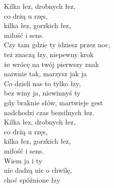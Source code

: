\begin{text}
    Kilka łez, drobnych łez,\\
    co drżą u rzęs,\\
    kilka łez, gorzkich łez,\\
    miłość i sens.\\
    Czy tam gdzie ty idziesz przez noc,\\
    też znaczą łzy, niepewny krok\\
    że wrócę na twój pierwszy znak\\
    naiwnie tak, marzysz jak ja\\
    Co dzieli nas to tylko łzy,\\
    bez winy ja, niewinnyś ty\\
    gdy braknie słów, martwieje gest\\
    nadchodzi czas bezsilnych łez.\\
    Kilka łez, drobnych łez,\\
    co drżą u rzęs,\\
    kilka łez, gorzkich łez,\\
    miłość i sens.\\
    Wiem ja i ty\\
    nie dadzą nic o chwilę,\\
    choć spóźnione łzy
\end{text}
\begin{chord}

\end{chord}